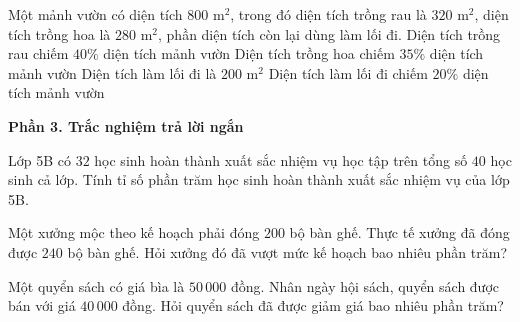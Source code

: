 \begin{ex} %
Một mảnh vườn có diện tích $800\text{ m}^2$, trong đó diện tích trồng rau là $320\text{ m}^2$, diện tích trồng hoa là $280\text{ m}^2$, phần diện tích còn lại dùng làm lối đi.
\choiceTF
{\True Diện tích trồng rau chiếm $40\%$ diện tích mảnh vườn}
{\True Diện tích trồng hoa chiếm $35\%$ diện tích mảnh vườn}
{\True Diện tích làm lối đi là $200\text{ m}^2$}
{Diện tích làm lối đi chiếm $20\%$ diện tích mảnh vườn}
\end{ex}

\textbf{Phần 3. Trắc nghiệm trả lời ngắn}

\begin{ex} %
Lớp 5B có $32$ học sinh hoàn thành xuất sắc nhiệm vụ học tập trên tổng số $40$ học sinh cả lớp. Tính tỉ số phần trăm học sinh hoàn thành xuất sắc nhiệm vụ của lớp 5B.
\end{ex}

\begin{ex} %
Một xưởng mộc theo kế hoạch phải đóng $200$ bộ bàn ghế. Thực tế xưởng đã đóng được $240$ bộ bàn ghế. Hỏi xưởng đó đã vượt mức kế hoạch bao nhiêu phần trăm?
\end{ex}

\begin{ex} %
Một quyển sách có giá bìa là $50\,000$ đồng. Nhân ngày hội sách, quyển sách được bán với giá $40\,000$ đồng. Hỏi quyển sách đã được giảm giá bao nhiêu phần trăm?
\end{ex}

